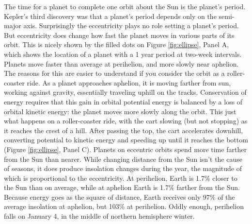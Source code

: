 The time for a planet to complete one orbit about the Sun is the planet's period. Kepler's third discovery was that a planet's period depends only on the semi-major axis. Surprisingly the eccentricity plays no role setting a planet's period. But eccentricity does change how fast the planet moves in various parts of its orbit.  This is nicely shown by the filled dots on Figure \ref{fig:ellipse}, Panel A, which shows the location of a planet with a 1 year period at two-week intervals. Planets move faster than average at perihelion, and more slowly near aphelion. The reasons for this are easier to understand if you consider the orbit as a roller-coaster ride. As a planet approaches aphelion, it is moving farther from sun, working against gravity, essentially traveling uphill on the tracks. Conservation of energy requires that this gain in orbital potential energy is balanced by a loss of orbital kinetic energy: the planet moves more slowly along the orbit. This just what happens on a roller-coaster ride, with the cart slowing (but not stopping) as it reaches the crest of a hill. After passing the top, the cart accelerates downhill, converting potential to kinetic energy and speeding up until it reaches the bottom (Figure \ref{fig:ellipse}, Panel C). Planets on eccentric orbits spend more time farther from the Sun than nearer. While changing distance from the Sun isn't the cause of seasons, it does produce insolation changes during the year, the magnitude of which is proportional to the eccentricity.  At perihelion, Earth is 1.7\% closer to the Sun than on average, while at aphelion Earth is 1.7\% farther from the Sun. Because energy goes as the square of distance, Earth receives only 97\% of the average insolation at aphelion, but 103\%  at perihelion. Oddly enough, perihelion falls on January 4, in the middle of northern hemisphere winter.\\


